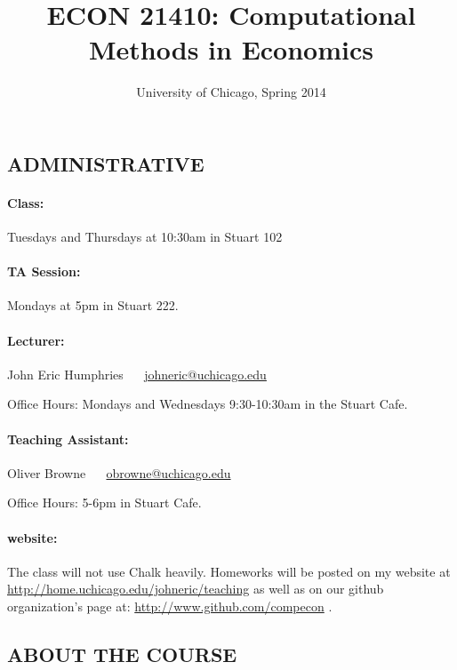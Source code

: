 \documentclass{scrartcl}
\title{ECON 21410: Computational Methods in Economics}
\subtitle{University of Chicago, Spring 2014}
\date{}
\begin{document}
\maketitle


\subsection*{ADMINISTRATIVE}

\paragraph{Class:} Tuesdays and Thursdays at 10:30am in Stuart 102

\paragraph{TA Session:} Mondays at 5pm in Stuart 222.

\paragraph{Lecturer:}  
John Eric Humphries ~~ \href{mailto:johneric@uchicago.edu}{johneric@uchicago.edu}

Office Hours: Mondays and Wednesdays 9:30-10:30am in the Stuart Cafe. 

\paragraph{Teaching Assistant:}
Oliver Browne ~~  \href{mailto:obrowne@uchicago.edu}{obrowne@uchicago.edu}

Office Hours: 5-6pm in Stuart Cafe.

\paragraph{website:}

The class will not use Chalk heavily. Homeworks will be posted on my website at \href{http://home.uchicago.edu/johneric/teaching}{http://home.uchicago.edu/johneric/teaching} as well as on our github organization's page at: \href{http://www.github.com/compecon}{http://www.github.com/compecon} .

\subsection*{ABOUT THE COURSE}
\end{document}
